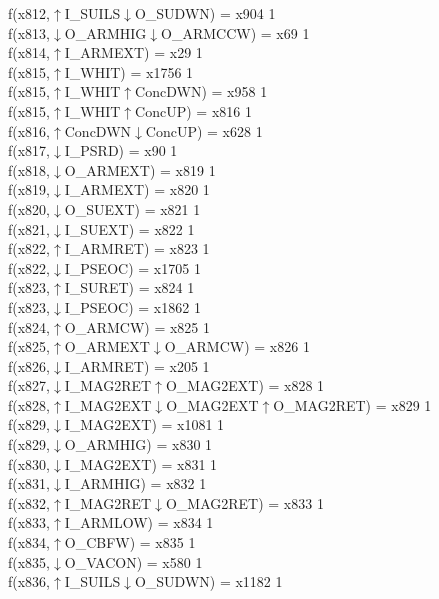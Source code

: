 f(x812,$\uparrow$I\_SUILS$\downarrow$O\_SUDWN) = x904 {1} \\
f(x813,$\downarrow$O\_ARMHIG$\downarrow$O\_ARMCCW) = x69 {1} \\
f(x814,$\uparrow$I\_ARMEXT) = x29 {1} \\
f(x815,$\uparrow$I\_WHIT) = x1756 {1} \\
f(x815,$\uparrow$I\_WHIT$\uparrow$ConcDWN) = x958 {1} \\
f(x815,$\uparrow$I\_WHIT$\uparrow$ConcUP) = x816 {1} \\
f(x816,$\uparrow$ConcDWN$\downarrow$ConcUP) = x628 {1} \\
f(x817,$\downarrow$I\_PSRD) = x90 {1} \\
f(x818,$\downarrow$O\_ARMEXT) = x819 {1} \\
f(x819,$\downarrow$I\_ARMEXT) = x820 {1} \\
f(x820,$\downarrow$O\_SUEXT) = x821 {1} \\
f(x821,$\downarrow$I\_SUEXT) = x822 {1} \\
f(x822,$\uparrow$I\_ARMRET) = x823 {1} \\
f(x822,$\downarrow$I\_PSEOC) = x1705 {1} \\
f(x823,$\uparrow$I\_SURET) = x824 {1} \\
f(x823,$\downarrow$I\_PSEOC) = x1862 {1} \\
f(x824,$\uparrow$O\_ARMCW) = x825 {1} \\
f(x825,$\uparrow$O\_ARMEXT$\downarrow$O\_ARMCW) = x826 {1} \\
f(x826,$\downarrow$I\_ARMRET) = x205 {1} \\
f(x827,$\downarrow$I\_MAG2RET$\uparrow$O\_MAG2EXT) = x828 {1} \\
f(x828,$\uparrow$I\_MAG2EXT$\downarrow$O\_MAG2EXT$\uparrow$O\_MAG2RET) = x829 {1} \\
f(x829,$\downarrow$I\_MAG2EXT) = x1081 {1} \\
f(x829,$\downarrow$O\_ARMHIG) = x830 {1} \\
f(x830,$\downarrow$I\_MAG2EXT) = x831 {1} \\
f(x831,$\downarrow$I\_ARMHIG) = x832 {1} \\
f(x832,$\uparrow$I\_MAG2RET$\downarrow$O\_MAG2RET) = x833 {1} \\
f(x833,$\uparrow$I\_ARMLOW) = x834 {1} \\
f(x834,$\uparrow$O\_CBFW) = x835 {1} \\
f(x835,$\downarrow$O\_VACON) = x580 {1} \\
f(x836,$\uparrow$I\_SUILS$\downarrow$O\_SUDWN) = x1182 {1} \\
